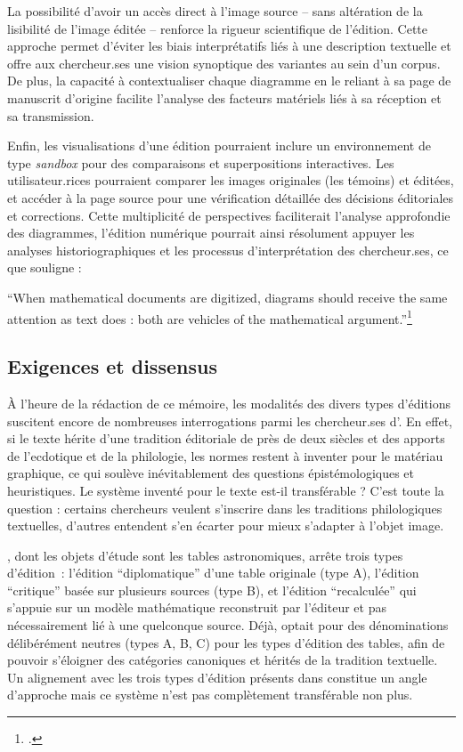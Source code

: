 La possibilité d'avoir un accès direct à l'image source -- sans
altération de la lisibilité de l'image éditée -- renforce la rigueur
scientifique de l'édition. Cette approche permet d'éviter les biais
interprétatifs liés à une description textuelle et offre aux chercheur.ses
une vision synoptique des variantes au sein d'un corpus. De plus, la
capacité à contextualiser chaque diagramme en le reliant à sa page de
manuscrit d'origine facilite l'analyse des facteurs matériels liés à sa
réception et sa transmission.

Enfin, les visualisations d'une édition pourraient inclure un
environnement de type \emph{sandbox} pour des comparaisons et superpositions
interactives. Les utilisateur.rices pourraient comparer les images originales
(les témoins) et éditées, et accéder à la page source pour une
vérification détaillée des décisions éditoriales et corrections. Cette
multiplicité de perspectives faciliterait l'analyse approfondie des
diagrammes, l'édition numérique pourrait ainsi résolument appuyer les
analyses historiographiques et les processus d'interprétation des
chercheur.ses, ce que souligne \citeauthor{roughan_digital_2014} :

\begin{kwote}
``When mathematical documents are digitized, diagrams should receive the
same attention as text does : both are vehicles of the mathematical
argument.''\footcite[p.78]{roughan_digital_2014}
\end{kwote}

\hypertarget{exigences-et-dissensus}{%
\subsection{Exigences et dissensus}\label{exigences-et-dissensus}}

À l'heure de la rédaction de ce mémoire, les modalités des divers types
d'éditions suscitent encore de nombreuses interrogations parmi les
chercheur.ses d'\eida. En effet, si le texte hérite d'une tradition
éditoriale de près de deux siècles et des apports de l'ecdotique et de
la philologie, les normes restent à inventer pour le matériau graphique,
ce qui soulève inévitablement des questions épistémologiques et
heuristiques. Le système inventé pour le texte est-il transférable ?
C'est toute la question : certains chercheurs veulent s'inscrire dans
les traditions philologiques textuelles, d'autres entendent s'en écarter
pour mieux s'adapter à l'objet image.

\dishas, dont les objets d'étude sont les tables astronomiques, arrête
trois types d'édition~: l'édition ``diplomatique'' d'une table originale
(type A), l'édition ``critique'' basée sur plusieurs sources (type B),
et l'édition ``recalculée'' qui s'appuie sur un modèle mathématique
reconstruit par l'éditeur et pas nécessairement lié à une quelconque
source. Déjà, \dishas optait pour des dénominations délibérément neutres
(types A, B, C) pour les types d'édition des tables, afin de pouvoir
s'éloigner des catégories canoniques et hérités de la tradition
textuelle. Un alignement avec les trois types d'édition présents dans
\dishas constitue un angle d'approche mais ce système n'est pas
complètement transférable non plus.

